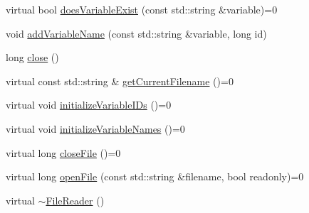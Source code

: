 \begin{DoxyCompactItemize}
\item 
virtual bool \hyperlink{classccmc_1_1_file_reader_ab8893f7d2b0f62041c37a788affe6b36}{does\-Variable\-Exist} (const std\-::string \&variable)=0
\item 
void \hyperlink{classccmc_1_1_file_reader_ac1bdd1a91c75f4afdf5a77a7e6944494}{add\-Variable\-Name} (const std\-::string \&variable, long id)
\item 
long \hyperlink{classccmc_1_1_file_reader_a036ac2d85ad32a98b81c9e6ebf0ef133}{close} ()
\item 
virtual const std\-::string \& \hyperlink{classccmc_1_1_file_reader_a9f266e85464a71985e6c922ba508aa9e}{get\-Current\-Filename} ()=0
\item 
virtual void \hyperlink{classccmc_1_1_file_reader_a2663bad21fc69c24f555b27d1cc2b8c8}{initialize\-Variable\-I\-Ds} ()=0
\item 
virtual void \hyperlink{classccmc_1_1_file_reader_a3517b66817277210916f6e5aa3db21a8}{initialize\-Variable\-Names} ()=0
\item 
virtual long \hyperlink{classccmc_1_1_file_reader_aa9b2ff7591f3d3f40ceb0007acbbe3ca}{close\-File} ()=0
\item 
virtual long \hyperlink{classccmc_1_1_file_reader_ae4346cb5cf1c4861135d3f293d3da320}{open\-File} (const std\-::string \&filename, bool readonly)=0
\item 
virtual \hyperlink{classccmc_1_1_file_reader_a83d4e886090a2ef02d3fcc799fe2d349}{$\sim$\-File\-Reader} ()
\end{DoxyCompactItemize}
